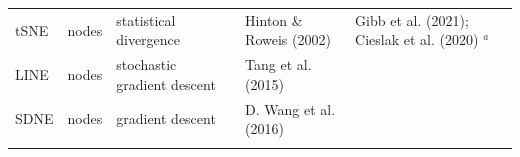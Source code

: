 \documentclass[10pt,oneside]{article}
\begin{document}
\begin{longtable}[]{@{}lllll@{}}
\midrule
\endhead
\begin{minipage}[t]{0.09\columnwidth}\raggedright
tSNE\strut
\end{minipage} & \begin{minipage}[t]{0.11\columnwidth}\raggedright
nodes\strut
\end{minipage} & \begin{minipage}[t]{0.23\columnwidth}\raggedright
statistical divergence\strut
\end{minipage} & \begin{minipage}[t]{0.14\columnwidth}\raggedright
Hinton \& Roweis (2002)\strut
\end{minipage} & \begin{minipage}[t]{0.29\columnwidth}\raggedright
Gibb et al. (2021); Cieslak et al. (2020) \(^a\)\strut
\end{minipage}\tabularnewline
\begin{minipage}[t]{0.09\columnwidth}\raggedright
LINE\strut
\end{minipage} & \begin{minipage}[t]{0.11\columnwidth}\raggedright
nodes\strut
\end{minipage} & \begin{minipage}[t]{0.23\columnwidth}\raggedright
stochastic gradient descent\strut
\end{minipage} & \begin{minipage}[t]{0.14\columnwidth}\raggedright
Tang et al. (2015)\strut
\end{minipage} & \begin{minipage}[t]{0.29\columnwidth}\raggedright
\strut
\end{minipage}\tabularnewline
\begin{minipage}[t]{0.09\columnwidth}\raggedright
SDNE\strut
\end{minipage} & \begin{minipage}[t]{0.11\columnwidth}\raggedright
nodes\strut
\end{minipage} & \begin{minipage}[t]{0.23\columnwidth}\raggedright
gradient descent\strut
\end{minipage} & \begin{minipage}[t]{0.14\columnwidth}\raggedright
D. Wang et al. (2016)\strut
\end{minipage} & \begin{minipage}[t]{0.29\columnwidth}\raggedright
\strut
\end{minipage}\tabularnewline
\begin{minipage}[t]{0.09\columnwidth}\raggedright

\end{minipage}
\end{longtable}
\end{document}
